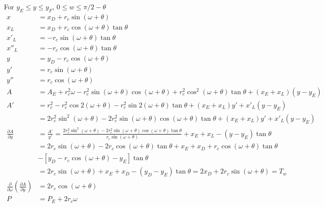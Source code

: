 \noindent For $y_E \le y \le y_F$, $0 \le w \le \pi/2 - \theta $
\begin{equation}
\begin{aligned}
x &= x_D +  r_c \sin(\omega +\theta) \\
x_L &= x_D +  r_c \cos(\omega +\theta) \tan\theta \\
x'_L &= -  r_c \sin(\omega +\theta) \tan\theta \\
x''_L &=-  r_c \cos(\omega +\theta) \tan\theta \\
y &= y_D - r_c \cos(\omega +\theta) \\
y' &=  r_c \sin(\omega +\theta) \\
y'' &=  r_c \cos(\omega +\theta) \\
A &= A_E +  r_c^2 \omega - r_c^2 \sin(\omega + \theta) \cos(\omega + \theta) + r_c^2 \cos^2(\omega + \theta) \tan\theta  + (x_E +x_L) (y - y_E)  \\
A' &=  r_c^2 - r_c^2 \cos 2(\omega + \theta) - r_c^2 \sin 2(\omega + \theta) \tan\theta  + (x_E +x_L)  y' +  x'_L (y - y_E) \\
   &=  2 r_c^2 \sin^2(\omega + \theta) - 2 r_c^2 \sin(\omega + \theta) \cos(\omega + \theta)\tan\theta  + (x_E +x_L)  y' +  x'_L (y - y_E) \\
\frac{\partial A}{\partial y} &= \frac{A'}{y'} = \frac{ 2 r_c^2 \sin ^2(\omega + \theta) -2 r_c^2 \sin (\omega + \theta) \cos (\omega + \theta) \tan\theta}{r_c \sin(\omega +\theta)} + x_E + x_L  - (y - y_E) \tan \theta\\
  &= 2r_c\sin(\omega + \theta) - 2r_c\cos(\omega + \theta)\tan\theta + x_E + x_D +  r_c \cos(\omega +\theta) \tan\theta \\
  & -  \left[y_D - r_c \cos(\omega +\theta) - y_E\right] \tan \theta \\
  &= 2r_c\sin(\omega + \theta) + x_E + x_D - (y_D - y_E) \tan\theta = 2x_D + 2r_c\sin(\omega + \theta) = T_w\\
\frac{\partial}{\partial \omega}\left( \frac{\partial A}{\partial y}\right) &=  2r_c\cos(\omega + \theta) \\
P &= P_E + 2 r_c \omega \\
\end{aligned}
\end{equation}

